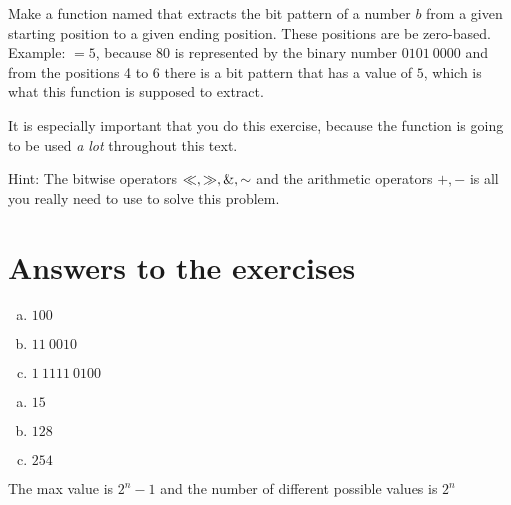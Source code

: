 \begin{Exercise}[label={getbits}]

Make a function named  that extracts
the bit pattern of a number $b$ from a given starting position to a
given ending position. These positions are be zero-based. Example:
$=5$, because $80$ is represented by the
binary number $0101\ 0000$ and from the positions 4 to 6 there is a
bit pattern that has a value of $5$, which is what this function is
supposed to extract.

It is especially important that you do this exercise, because the
function  is going to be used \textit{a lot}
throughout this text.

Hint: The bitwise operators $\ll, \gg, \mathrel{\&},
\mathord{\sim}$ and the arithmetic operators $+,-$ is all you really need to
use to solve this problem.

\end{Exercise}

\section{Answers to the exercises}

\begin{Answer}[ref={n-to-bin}]
  \begin{enumerate}[(a)]
  \item $100$
  \item $11\ 0010$
  \item $1\ 1111\ 0100$
  \end{enumerate}
\end{Answer}

\begin{Answer}[ref={bin-to-n}]
  \begin{enumerate}[(a)]
  \item $15$
  \item $128$
  \item $254$
  \end{enumerate}
\end{Answer}

\begin{Answer}[ref={n-bits-max-val}]
  The max value is $2^n - 1$ and the number of different possible
  values is $2^n$
\end{Answer}

